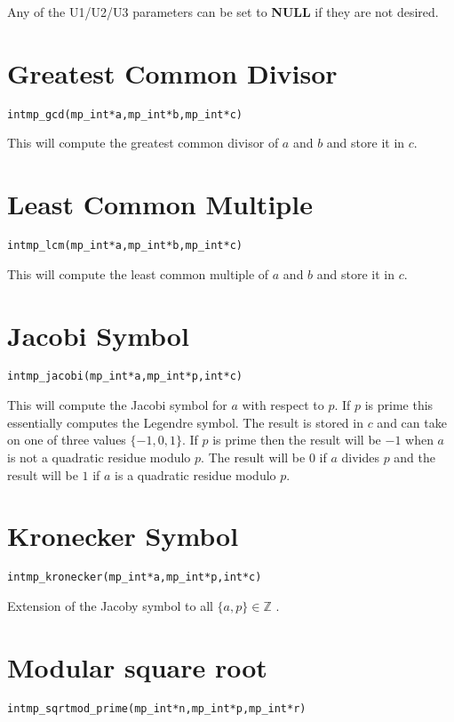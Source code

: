 \documentclass[synpaper]{book}
\begin{document}
Any of the U1/U2/U3 parameters can be set to \textbf{NULL} if they are not desired.

\section{Greatest Common Divisor}
\begin{alltt}
int mp_gcd (mp_int * a, mp_int * b, mp_int * c)
\end{alltt}
This will compute the greatest common divisor of $a$ and $b$ and store it in $c$.

\section{Least Common Multiple}
\begin{alltt}
int mp_lcm (mp_int * a, mp_int * b, mp_int * c)
\end{alltt}
This will compute the least common multiple of $a$ and $b$ and store it in $c$.

\section{Jacobi Symbol}
\begin{alltt}
int mp_jacobi (mp_int * a, mp_int * p, int *c)
\end{alltt}
This will compute the Jacobi symbol for $a$ with respect to $p$.  If $p$ is prime this essentially computes the Legendre
symbol.  The result is stored in $c$ and can take on one of three values $\lbrace -1, 0, 1 \rbrace$.  If $p$ is prime
then the result will be $-1$ when $a$ is not a quadratic residue modulo $p$.  The result will be $0$ if $a$ divides $p$
and the result will be $1$ if $a$ is a quadratic residue modulo $p$.

\section{Kronecker Symbol}
\begin{alltt}
int mp_kronecker (mp_int * a, mp_int * p, int *c)
\end{alltt}
Extension of the Jacoby symbol to all $\lbrace a, p \rbrace \in \mathbb{Z}$ .


\section{Modular square root}
\begin{alltt}
int mp_sqrtmod_prime(mp_int *n, mp_int *p, mp_int *r)
\end{alltt}
\end{document}
